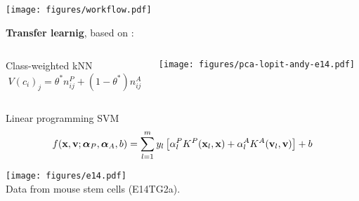 \begin{frame}
  \begin{center}
    \texttt{[image: figures/workflow.pdf]}      
  \end{center}
\end{frame}

\begin{frame}
  \textbf{Transfer learnig}, based on \cite{Wu:2004}:
  \begin{columns}[t]
    \begin{column}[T]{0.5\textwidth}            
      \begin{block}{Class-weighted kNN}      
        \begin{equation*}
          \label{eq:translearn}
          V(c_i)_j = \theta^* n_{ij}^{P} + (1 - \theta^*) n_{ij}^{A}
        \end{equation*}
      \end{block}
    \end{column}
    \begin{column}[T]{0.4\textwidth} 
      \texttt{[image: figures/pca-lopit-andy-e14.pdf]} \\
    \end{column}    
  \end{columns}
  \begin{block}{Linear programming SVM}
    \begin{equation*}\label{eq:translearn2}
      f(\mathbf{x}, \mathbf{v}; \bm{\alpha}_P, \bm{\alpha}_A, b) = \sum_{l=1}^m y_l \left[ \alpha_l^P
        K^P(\mathbf{x}_l, \mathbf{x}) + \alpha_l^A K^A(\mathbf{v}_l, \mathbf{v}) \right] + b
    \end{equation*}
  \end{block}
\end{frame}


% 



\begin{frame}
  \texttt{[image: figures/e14.pdf]}
  \\
  \scriptsize
  Data from mouse stem cells (E14TG2a).
\end{frame}


